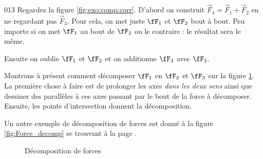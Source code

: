 \documentclass{article}
\begin{document}
\begin{corrige}{013}
Regardez la figure \ref{fig:exo:comp:corr}. D'abord on construit $\overrightarrow{F}_4=\overrightarrow{F}_1+\overrightarrow{F}_2$ en ne regardant pas $\overrightarrow{F}_3$. Pour cela, on met juste $\fF_1$ et $\fF_2$ bout à bout. Peu importe si on met $\fF_1$ au bout de $\fF_2$ ou le contraire : le résultat sera le même.


Ensuite on oublie $\fF_1$ et $\fF_2$ et on additionne $\fF_4$ avec $\fF_3$.

Montrons à présent comment décomposer $\fF_1$ en $\fF_2$ et $\fF_3$ sur la figure \ref{fig_decom013}. La première chose à faire est de prolonger les axes \emph{dans les deux sens} ainsi que dessiner des parallèles à ces axes passant par le bout de la force à décomposer. Ensuite, les points d'intersection donnent la décomposition.

Un autre exemple de décomposition de forces est donné à la figure \ref{fig:Force_decomp} se trouvant à la page \pageref{fig:Force_decomp}.

\begin{figure}[ht]
\centering
\caption{Décomposition de forces}\label{fig_decom013}
\end{figure}

\end{corrige}
\end{document}

